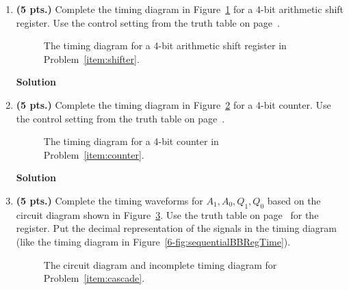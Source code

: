 \begin{enumerate}
    \item\textbf{ (5 pts.)} Complete the timing diagram in Figure~\ref{fig:hwshift}
        \label{item:shifter}
        for a 4-bit arithmetic shift register.  Use the control setting from the
        truth table on page~\pageref{page:shi}.
        \begin{figure}[ht]
            \caption{The timing diagram for a 4-bit arithmetic shift register in
            Problem~\ref{item:shifter}.}
            \label{fig:hwshift}
        \end{figure}

        \begin{onlysolution}  \textbf{Solution} \itshape{
                \begin{figure}[ht]
                \end{figure}
            }
        \end{onlysolution}

    \item\textbf{ (5 pts.)} Complete the timing diagram in Figure~\ref{fig:hwcount}
        \label{item:counter}
        for a 4-bit counter.  Use the control setting from the truth table on
        page~\pageref{page:counter}.
        \begin{figure}[ht]
            \caption{The timing diagram for a 4-bit counter in
            Problem~\ref{item:counter}.}
            \label{fig:hwcount}
        \end{figure}

        \begin{onlysolution}  \textbf{Solution} \itshape{
                \begin{figure}[ht]
                \end{figure}
            }
        \end{onlysolution}

    \item\textbf{ (5 pts.)} Complete the timing waveforms for $A_1, A_0, Q_1, Q_0$
        \label{item:cascade}
        based on the circuit diagram shown in Figure~\ref{fig:cascade}.  Use the truth
        table on page~\pageref{page:reg} for the register. Put the decimal
        representation of the signals in the timing diagram (like the timing
        diagram in Figure~\ref{6-fig:sequentialBBRegTime}).
        \begin{figure}[ht]
            \caption{The circuit diagram and incomplete timing diagram for
            Problem~\ref{item:cascade}.}
            \label{fig:cascade}
        \end{figure}


\end{enumerate}

